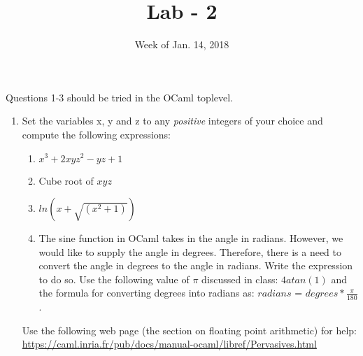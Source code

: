 \documentclass{article}
\title{Lab - 2}
\date{Week of Jan. 14, 2018}
\begin{document}
\maketitle

Questions 1-3 should be tried in the OCaml toplevel.
\begin{enumerate}

\item Set the variables x, y and z to any \emph{positive} integers of your choice and compute the following expressions:
	\begin{enumerate}
		\item $x^3 + 2xyz^2 - yz + 1$
		\item Cube root of $xyz$
		\item $ln (x + \sqrt{(x^2 + 1)})$
		\item The sine function in OCaml takes in the angle in radians. However, we would like to supply the angle in degrees. Therefore, there is a need to convert the angle in degrees to the angle in radians. Write the expression to do so. Use the following value of $\pi$ discussed in class: $4atan(1)$ and the formula for converting degrees into radians as: 
		$radians$ = $degrees * \frac{\pi}{180}$.
	\end{enumerate}
Use the following web page (the section on floating point arithmetic) for help: \url{https://caml.inria.fr/pub/docs/manual-ocaml/libref/Pervasives.html}


\end{enumerate}
\end{document}
